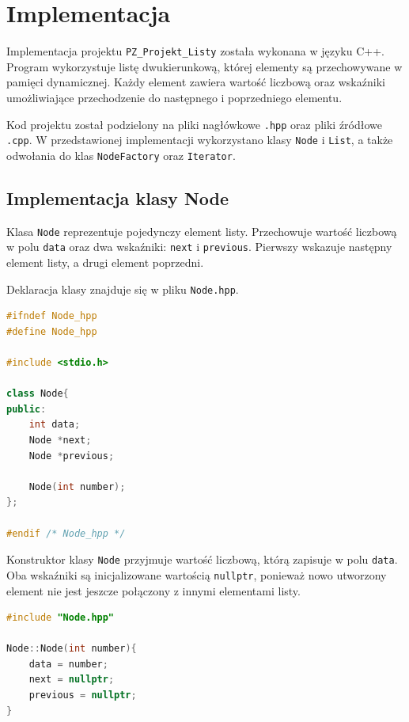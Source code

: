\newpage
\section{Implementacja}

Implementacja projektu \texttt{PZ\_Projekt\_Listy} została wykonana w języku C++. Program wykorzystuje listę dwukierunkową, której elementy są przechowywane w pamięci dynamicznej. Każdy element zawiera wartość liczbową oraz wskaźniki umożliwiające przechodzenie do następnego i poprzedniego elementu.

Kod projektu został podzielony na pliki nagłówkowe \texttt{.hpp} oraz pliki źródłowe \texttt{.cpp}. W przedstawionej implementacji wykorzystano klasy \texttt{Node} i \texttt{List}, a także odwołania do klas \texttt{NodeFactory} oraz \texttt{Iterator}.

\subsection{Implementacja klasy Node}

Klasa \texttt{Node} reprezentuje pojedynczy element listy. Przechowuje wartość liczbową w polu \texttt{data} oraz dwa wskaźniki: \texttt{next} i \texttt{previous}. Pierwszy wskazuje następny element listy, a drugi element poprzedni.

Deklaracja klasy znajduje się w pliku \texttt{Node.hpp}.

\begin{lstlisting}[language=C++, caption={Deklaracja klasy Node}]
#ifndef Node_hpp
#define Node_hpp

#include <stdio.h>

class Node{
public:
    int data;
    Node *next;
    Node *previous;

    Node(int number);
};

#endif /* Node_hpp */
\end{lstlisting}

Konstruktor klasy \texttt{Node} przyjmuje wartość liczbową, którą zapisuje w polu \texttt{data}. Oba wskaźniki są inicjalizowane wartością \texttt{nullptr}, ponieważ nowo utworzony element nie jest jeszcze połączony z innymi elementami listy.

\begin{lstlisting}[language=C++, caption={Konstruktor klasy Node}]
#include "Node.hpp"

Node::Node(int number){
    data = number;
    next = nullptr;
    previous = nullptr;
}
\end{lstlisting}

